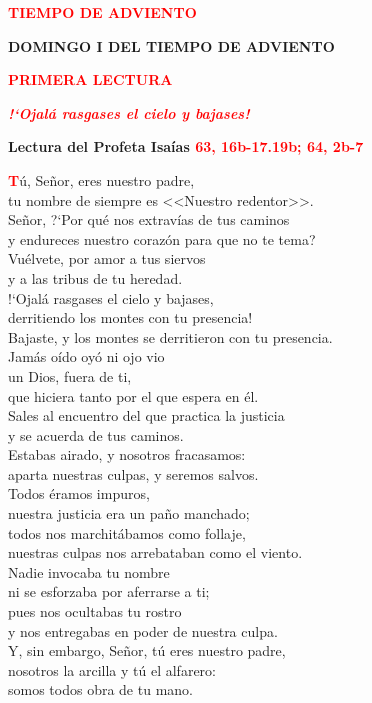 \documentclass[12pt, letterpaper]{report}
\begin{document}
\begin{center}
\Large {\bfseries \textcolor{red}{TIEMPO DE ADVIENTO}}
\end{center}

\begin{center}
\Huge {\bfseries DOMINGO I DEL TIEMPO DE ADVIENTO}
\end{center}

\begin{center}
\Large {\bfseries \textcolor{red}{PRIMERA LECTURA}}
\end{center}

\begin{center}
\large {\bfseries \textit{ \textcolor{red}{!`Ojal\'a rasgases el cielo y bajases!}}}
\end{center}

\Large {\bfseries Lectura del Profeta Isa\'ias \hspace{1cm} \textcolor{red}{63, 16b-17.19b; 64, 2b-7}}

\lettrine[lines=1]{\bfseries \textcolor{red}{T}}{}\Large \'u, Se\~nor, eres nuestro padre,\\
tu nombre de siempre es <<Nuestro redentor>>.\\
Se\~nor, ?`Por qu\'e nos extrav\'ias de tus caminos\\
y endureces nuestro coraz\'on para que no te tema?\\
Vu\'elvete, por amor a tus siervos\\
y a las tribus de tu heredad.\\
!`Ojal\'a rasgases el cielo y bajases,\\
derritiendo los montes con tu presencia!\\
Bajaste, y los montes se derritieron con tu presencia.\\
Jam\'as o\'ido oy\'o ni ojo vio\\
un Dios, fuera de ti,\\
que hiciera tanto por el que espera en \'el.\\
Sales al encuentro del que practica la justicia\\
y se acuerda de tus caminos.\\
Estabas airado, y nosotros fracasamos:\\
aparta nuestras culpas, y seremos salvos.\\
Todos \'eramos impuros,\\
nuestra justicia era un pa\~no manchado;\\
todos nos marchit\'abamos como follaje,\\
nuestras culpas nos arrebataban como el viento.\\
Nadie invocaba tu nombre\\
ni se esforzaba por aferrarse a ti;\\
pues nos ocultabas tu rostro\\
y nos entregabas en poder de nuestra culpa.\\
Y, sin embargo, Se\~nor, t\'u eres nuestro padre,\\
nosotros la arcilla y t\'u el alfarero:\\
somos todos obra de tu mano.
\end{document}
